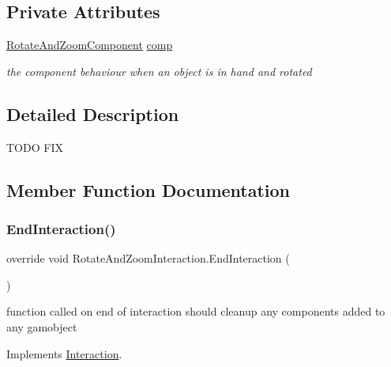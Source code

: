\subsection*{Private Attributes}
\begin{DoxyCompactItemize}
\item 
\mbox{\hyperlink{class_rotate_and_zoom_component}{Rotate\+And\+Zoom\+Component}} \mbox{\hyperlink{class_rotate_and_zoom_interaction_aa7e134944534d6e72863edcd54a87d8f}{comp}}
\begin{DoxyCompactList}\small\item\em the component behaviour when an object is in hand and rotated \end{DoxyCompactList}\end{DoxyCompactItemize}


\subsection{Detailed Description}
T\+O\+DO F\+IX 



\subsection{Member Function Documentation}
\mbox{\label{class_rotate_and_zoom_interaction_af0c13721da9fee4e1f7ce226d4cf7bea}} 
\subsubsection{\texorpdfstring{End\+Interaction()}{EndInteraction()}}
{\footnotesize\ttfamily override void Rotate\+And\+Zoom\+Interaction.\+End\+Interaction (\begin{DoxyParamCaption}{ }\end{DoxyParamCaption})\hspace{0.3cm}{\ttfamily [virtual]}}



function called on end of interaction should cleanup any components added to any gamobject 



Implements \mbox{\hyperlink{class_interaction_a13c7d99dbecf8e0d61973fd23de6400c}{Interaction}}.

